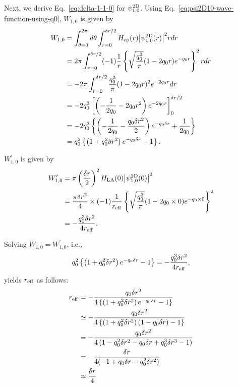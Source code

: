 \documentclass[aip-draft.tex]{subfiles}
\begin{document}
Next, we derive Eq.~\eqref{eq:delta-1-1-0} for $\psi^{\mathrm{2D}}_{1,0}$.
Using Eq.~\eqref{eq:psi2D10-wave-function-using-q0}, $W_{1,0}$ is given by
\begin{align}
  W_{1,0}
   &= \int_{\theta=0}^{2\pi}d\theta
      \int_{r=0}^{\delta r/2}H_{\mathrm{ep}}(r){\left| \psi^{\mathrm{2D}}_{1,0}(r) \right|}^2r dr\notag\\
   &= 2\pi\int_{r=0}^{\delta r/2}
      (-1)\frac{1}{r}
      \left\{\sqrt{\frac{q_0^3}{\pi}}(1-2q_0 r)e^{-q_0 r}\right\}^2
      r dr\notag\\
   &= -2\pi\int_{r=0}^{\delta r/2}\frac{q_0^3}{\pi}(1-2q_0r)^2e^{-2q_0r}dr\notag\\
   &= -2q_0^3\left[\left(-\frac{1}{2q_0}-2q_0r^2\right)e^{-2q_0r}\right]_{0}^{\delta r/2} \notag\\
   &= -2q_0^3\left\{\left(-\frac{1}{2q_0}-\frac{q_0\delta r^2}{2}\right)e^{-q_0\delta r}+\frac{1}{2q_0}\right\}\notag\\
   &= q_0^2\left\{\left(1+q_0^2\delta r^2\right)e^{-q_0\delta r}-1\right\} .
\end{align}

$W_{1,0}^\prime$ is given by
\begin{align}
    W_{1,0}^\prime
    &=\pi\left(\frac{\delta r}{2}\right)^2
         H_{\mathrm{LA}}(0){\left| \psi^{\mathrm{2D}}_{1,0}(0) \right|}^2\notag\\
    &=\frac{\pi\delta r^2}{4}\times(-1)\frac{1}{r_{\mathrm{eff}}}
      \left\{\sqrt{\frac{q_0^3}{\pi}}(1-2q_0 \times 0)e^{-q_0 \times 0}\right\}^2\notag\\
    &= -\frac{q_0^3\delta r^2}{4r_{\mathrm{eff}}} .
\end{align}

Solving $W_{1,0}=W_{1,0}^\prime$, i.e.,
\begin{equation}
q_0^2\left\{\left(1+q_0^2\delta r^2\right)e^{-q_0\delta r}-1\right\} = -\frac{q_0^3\delta r^2}{4r_{\mathrm{eff}}},
\end{equation}
yields $r_{\mathrm{eff}}$ as follows:
\begin{align}
r_{\mathrm{eff}}&=-\frac{q_0\delta r^2}{4\left\{\left(1+q_0^2\delta r^2\right)e^{-q_0\delta r}-1\right\}}\notag\\
&\simeq-\frac{q_0\delta r^2}{4\left\{\left(1+q_0^2\delta r^2\right)(1-q_0\delta r)-1\right\}}\notag\\
&=-\frac{q_0\delta r^2}{4\left(1-q_0^2\delta r^2-q_0\delta r+q_0^3\delta r^3-1\right)}\notag\\
&=-\frac{\delta r}{4(-1+q_0\delta r-q_0^2\delta r^2)}\notag\\
&\simeq\frac{\delta r}{4}
\end{align}
\end{document}
